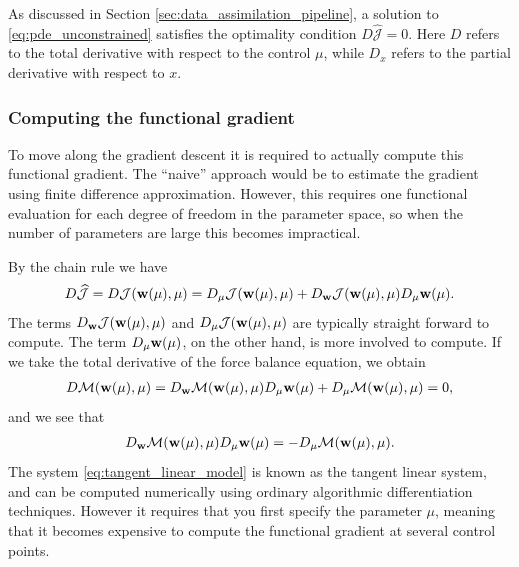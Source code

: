 As discussed in Section \ref{sec:data_assimilation_pipeline}, a
solution to \eqref{eq:pde_unconstrained} satisfies the optimality
condition $D  \widehat{\mathcal{J}} = 0$. Here $D$ refers to the
total derivative with respect to the control $\mu$, while $D_{x}$
refers to the partial derivative with respect to $x$.

\subsubsection{Computing the functional gradient} 
To move along the gradient descent it is required to actually
compute this functional gradient. The ``naive'' approach would be to
estimate the gradient using finite difference approximation. However,
this requires one functional evaluation for each degree of freedom in
the parameter space, so when the number of parameters are large this
becomes impractical.

By the chain rule we have
\begin{align*}
  D  \widehat{\mathcal{J}}  =  D  \mathcal{J}(\mathbf{w}(\mu), \mu) =
   D_{\mu}\mathcal{J}(\mathbf{w}(\mu), \mu) + D_{\mathbf{w}}\mathcal{J}(\mathbf{w}(\mu), \mu) D_{\mu}\mathbf{w}(\mu).
\end{align*}
The terms $D_{\mathbf{w}}\mathcal{J}(\mathbf{w}(\mu), \mu)$ and
$D_{\mu}\mathcal{J}(\mathbf{w}(\mu), \mu)$ are typically straight forward
to compute. The term $D_{\mu}\mathbf{w}(\mu)$, on the other hand, is more
involved to compute.  If we take the total derivative of the
force balance equation, we obtain
\begin{align*}
  D \mathcal{M}(\mathbf{w}(\mu), \mu) =
  D_{\mathbf{w}} \mathcal{M}(\mathbf{w}(\mu), \mu) D_{\mu}\mathbf{w}(\mu)
  +  D_{\mu} \mathcal{M}(\mathbf{w}(\mu), \mu)  = 0,
\end{align*}
and we see that
\begin{align}
  D_{\mathbf{w}} \mathcal{M}(\mathbf{w}(\mu), \mu)  D_{\mu}\mathbf{w}(\mu) = - D_{\mu} \mathcal{M}(\mathbf{w}(\mu), \mu).
  \label{eq:tangent_linear_model}
\end{align}
The system \eqref{eq:tangent_linear_model} is known as the tangent
linear system, and can be computed numerically using ordinary
algorithmic differentiation techniques. However it requires that you
first specify the parameter $\mu$, meaning that it becomes expensive to
compute the functional gradient at several control points. 

